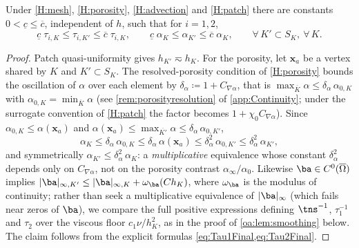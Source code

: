 \begin{lemma}
\label{oa:lem:patch}
Under \cref{H:mesh}, \cref{H:porosity}, \cref{H:advection} and \cref{H:patch} there are constants
$0 < \underline{c} \le \overline{c}$, independent of $h$, such that for $i = 1,2$,
\begin{equation}
  \label{oa:eq:PatchEquivalence}
  \underline{c}\;\tau_{i,K} \le \tau_{i,K'} \le \overline{c}\;\tau_{i,K},
  \qquad
  \underline{c}\;\alpha_{K} \le \alpha_{K'} \le \overline{c}\;\alpha_{K},
  \qquad \forall\, K' \subset S_K,\ \forall\, K.
\end{equation}
\end{lemma}

\begin{proof}
Patch quasi-uniformity gives $h_{K'} \eqsim h_K$. For the porosity, let $\boldsymbol{x}_a$ be a
vertex shared by $K$ and $K' \subset S_K$. The resolved{\hyp}porosity condition of \cref{H:porosity}
bounds the oscillation of $\alpha$ over each element by $\delta_\alpha \coloneqq 1 + C_{\nabla\alpha}$,
that is $\max_{\overline{K}}\alpha \le \delta_\alpha\,\alpha_{0,K}$ with
$\alpha_{0,K}=\min_{\overline{K}}\alpha$ (see \cref{rem:porosityresolution} of
\cref{app:Continuity}; under the surrogate convention of \cref{H:patch} the factor becomes
$1+\chi_0 C_{\nabla\alpha}$).
Since $\alpha_{0,K}\le\alpha(\boldsymbol{x}_a)$ and $\alpha(\boldsymbol{x}_a)\le\max_{\overline{K'}}\alpha\le\delta_\alpha\,\alpha_{0,K'}$,
\begin{equation*}
  \alpha_K \le \delta_\alpha\,\alpha_{0,K} \le \delta_\alpha\,\alpha(\boldsymbol{x}_a)
  \le \delta_\alpha^{2}\,\alpha_{0,K'} \le \delta_\alpha^{2}\,\alpha_{K'},
\end{equation*}
and symmetrically $\alpha_{K'}\le\delta_\alpha^{2}\,\alpha_K$: a \emph{multiplicative} equivalence whose
constant $\delta_\alpha^{2}$ depends only on $C_{\nabla\alpha}$, not on the porosity contrast
$\alpha_\infty/\alpha_0$. Likewise $\ba \in C^0(\overline\Omega)$ implies $|\ba|_{\infty,K'} \le
|\ba|_{\infty,K} + \omega_{\ba}(Ch_K)$, where $\omega_{\ba}$ is the modulus of continuity; rather than
seek a multiplicative equivalence of $|\ba|_\infty$ (which fails near zeros of $\ba$), we compare the
full positive expressions defining $\tns^{-1}$, $\tau_1^{-1}$ and $\tau_2$ over the viscous floor
$c_1\nu/h_K^2$, as in the proof of \cref{oa:lem:smoothing} below. The claim follows from the explicit
formulas \cref{eq:Tau1Final,eq:Tau2Final}.
\end{proof}

